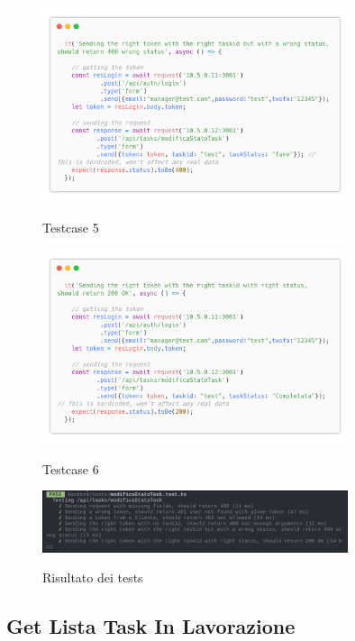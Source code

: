 \documentclass{report}
\begin{document}
\begin{figure}[H]
	\centering\includegraphics[width=0.8\textwidth]{images/code_modifica_stato_test5.png}

	Testcase 5
\end{figure}
\begin{figure}[H]
	\centering\includegraphics[width=0.8\textwidth]{images/code_modifica_stato_test6.png}

	Testcase 6
\end{figure}

\begin{figure}[H]
	\centering\includegraphics[width=0.8\textwidth]{images/jest_modifica_stato.png}

	Risultato dei tests
\end{figure}

\subsection{Get Lista Task In Lavorazione}
\end{document}
